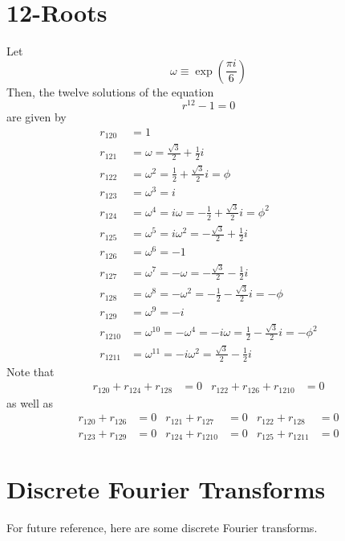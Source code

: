 \section{12-Roots}
Let
\begin{equation}
    \omega \equiv \exp\left( \frac{\pi i}{6} \right)
\end{equation}
Then, the twelve solutions of the equation
\begin{equation}
    r^{12} - 1 = 0
\end{equation}
are given by
\begin{align}
    r_{120} &= 1 \\
    r_{121} &= \omega = \frac{\sqrt{3}}{2} + \frac{1}{2}i \\
    r_{122} &= \omega^{2} = \frac{1}{2} + \frac{\sqrt{3}}{2}i = \phi \\
    r_{123} &= \omega^{3} = i \\
    r_{124} &= \omega^{4} = i \omega = -\frac{1}{2} + \frac{\sqrt{3}}{2}i = \phi^{2} \\
    r_{125} &= \omega^{5} = i \omega^{2} = -\frac{\sqrt{3}}{2} + \frac{1}{2}i \\
    r_{126} &= \omega^{6} = -1 \\
    r_{127} &= \omega^{7} = -\omega = -\frac{\sqrt{3}}{2} - \frac{1}{2}i \\
    r_{128} &= \omega^{8} = -\omega^{2} = -\frac{1}{2} - \frac{\sqrt{3}}{2}i = -\phi \\
    r_{129} &= \omega^{9} = -i \\
    r_{1210} &= \omega^{10} = -\omega^{4} = -i\omega = \frac{1}{2} - \frac{\sqrt{3}}{2}i = -\phi^{2} \\
    r_{1211} &= \omega^{11} = -i \omega^{2} = \frac{\sqrt{3}}{2} - \frac{1}{2}i
\end{align}
Note that
\begin{align}
    r_{120} + r_{124} + r_{128} &= 0 & r_{122} + r_{126} + r_{1210} &= 0
\end{align}
as well as
\begin{align}
    r_{120} + r_{126} &= 0 & r_{121} + r_{127} &= 0 & r_{122} + r_{128} &= 0 \\
    r_{123} + r_{129} &= 0 & r_{124} + r_{1210} &= 0 & r_{125} + r_{1211} &= 0
\end{align}
\section{Discrete Fourier Transforms}
For future reference, here are some discrete Fourier transforms.
